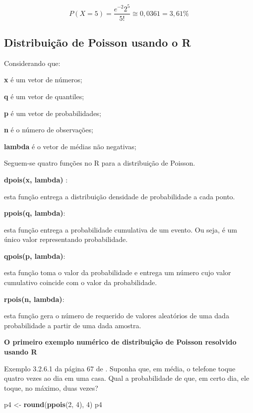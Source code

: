 \documentclass[
]{book}
\newenvironment{Shaded}{\begin{snugshade}}{\end{snugshade}}
\newcommand{\DecValTok}[1]{\textcolor[rgb]{0.00,0.00,0.81}{#1}}
\newcommand{\KeywordTok}[1]{\textcolor[rgb]{0.13,0.29,0.53}{\textbf{#1}}}
\newcommand{\NormalTok}[1]{#1}
\newcommand{\StringTok}[1]{\textcolor[rgb]{0.31,0.60,0.02}{#1}}
\begin{document}
\begin{equation*}
  P(X=5) = \frac{e^{-2}2^{5}}{5!} \cong 0,0361 = 3,61\%
\end{equation*}

\hypertarget{distribuiuxe7uxe3o-de-poisson-usando-o-r}{%
\subsection{Distribuição de Poisson usando o R}\label{distribuiuxe7uxe3o-de-poisson-usando-o-r}}

Considerando que:

\textbf{x} é um vetor de números;

\textbf{q} é um vetor de quantiles;

\textbf{p} é um vetor de probabilidades;

\textbf{n} é o número de observações;

\textbf{lambda} é o vetor de médias não negativas;

Seguem-se quatro funções no R para a distribuição de Poisson.

\textbf{dpois(x, lambda)} :

esta função entrega a distribuição densidade de probabilidade a cada ponto.

\textbf{ppois(q, lambda)}:

esta função entrega a probabilidade cumulativa de um evento. Ou seja, é um único valor representando probabilidade.

\textbf{qpois(p, lambda)}:

esta função toma o valor da probabilidade e entrega um número cujo valor cumulativo coincide com o valor da probabilidade.

\textbf{rpois(n, lambda)}:

esta função gera o número de requerido de valores aleatórios de uma dada probabilidade a partir de uma dada amostra.

\textbf{O primeiro exemplo numérico de distribuição de Poisson resolvido usando R}

Exemplo 3.2.6.1 da página 67 de \citet{Sartoris2013}. Suponha que, em média, o telefone toque quatro vezes ao dia em uma casa. Qual a probabilidade de que, em certo dia, ele toque, no máximo, duas vezes?

\begin{Shaded}
\begin{Highlighting}[]
\NormalTok{p4 <-}\StringTok{ }\KeywordTok{round}\NormalTok{(}\KeywordTok{ppois}\NormalTok{(}\DecValTok{2}\NormalTok{, }\DecValTok{4}\NormalTok{), }\DecValTok{4}\NormalTok{)}
\NormalTok{p4}
\end{Highlighting}
\end{Shaded}
\end{document}
